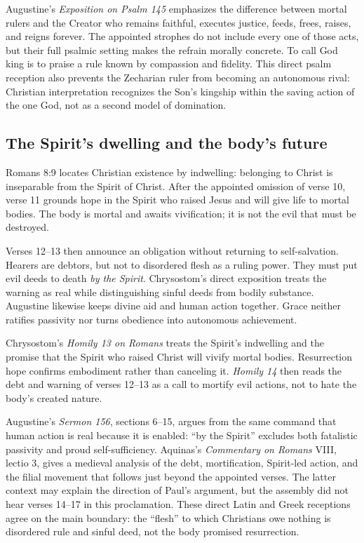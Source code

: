 Augustine's \emph{Exposition on Psalm 145} emphasizes the difference between mortal rulers and the Creator who remains faithful, executes justice, feeds, frees, raises, and reigns forever. The appointed strophes do not include every one of those acts, but their full psalmic setting makes the refrain morally concrete. To call God king is to praise a rule known by compassion and fidelity. This direct psalm reception also prevents the Zecharian ruler from becoming an autonomous rival: Christian interpretation recognizes the Son's kingship within the saving action of the one God, not as a second model of domination.

\subsection*{The Spirit's dwelling and the body's future\enspace{}}

Romans 8:9 locates Christian existence by indwelling: belonging to Christ is inseparable from the Spirit of Christ. After the appointed omission of verse 10, verse 11 grounds hope in the Spirit who raised Jesus and will give life to mortal bodies. The body is mortal and awaits vivification; it is not the evil that must be destroyed.

Verses 12--13 then announce an obligation without returning to self-salvation. Hearers are debtors, but not to disordered flesh as a ruling power. They must put evil deeds to death \emph{by the Spirit}. Chrysostom's direct exposition treats the warning as real while distinguishing sinful deeds from bodily substance. Augustine likewise keeps divine aid and human action together. Grace neither ratifies passivity nor turns obedience into autonomous achievement.

Chrysostom's \emph{Homily 13 on Romans} treats the Spirit's indwelling and the promise that the Spirit who raised Christ will vivify mortal bodies. Resurrection hope confirms embodiment rather than canceling it. \emph{Homily 14} then reads the debt and warning of verses 12--13 as a call to mortify evil actions, not to hate the body's created nature.

Augustine's \emph{Sermon 156}, sections 6--15, argues from the same command that human action is real because it is enabled: “by the Spirit” excludes both fatalistic passivity and proud self-sufficiency. Aquinas's \emph{Commentary on Romans} VIII, lectio 3, gives a medieval analysis of the debt, mortification, Spirit-led action, and the filial movement that follows just beyond the appointed verses. The latter context may explain the direction of Paul's argument, but the assembly did not hear verses 14--17 in this proclamation. These direct Latin and Greek receptions agree on the main boundary: the “flesh” to which Christians owe nothing is disordered rule and sinful deed, not the body promised resurrection.

